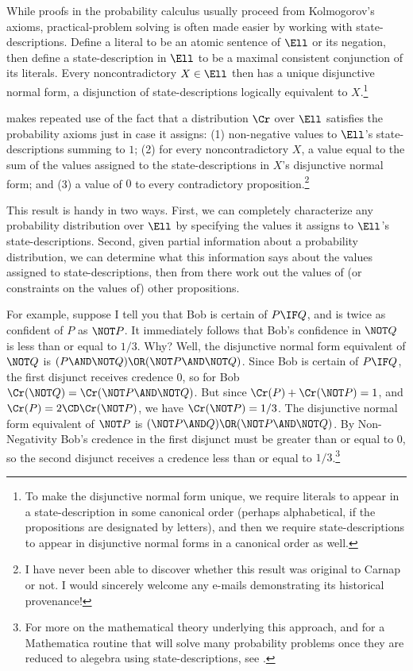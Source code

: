 While proofs in the probability calculus usually proceed from Kolmogorov's axioms, practical-problem solving is often made easier by working with state-descriptions. Define a literal to be an atomic sentence of $\Ell$ or its negation, then define a state-description in $\Ell$ to be a maximal consistent conjunction of its literals. Every noncontradictory $X \in \Ell$ then has a unique disjunctive normal form, a disjunction of state-descriptions logically equivalent to $X$.\footnote
{To make the disjunctive normal form unique, we require literals to appear in a state-description in some canonical order (perhaps alphabetical, if the propositions are designated by letters), and then we require state-descriptions to appear in disjunctive normal forms in a canonical order as well.}

\citet{CarnapLogical} makes repeated use of the fact that a distribution $\Cr$ over $\Ell$ satisfies the probability axioms just in case it assigns: (1) non-negative values to $\Ell$'s state-descriptions summing to $1$; (2) for every noncontradictory $X$, a value equal to the sum of the values assigned to the state-descriptions in $X$'s disjunctive normal form; and (3) a value of $0$ to every contradictory proposition.\footnote
{I have never been able to discover whether this result was original to Carnap or not. I would sincerely welcome any e-mails demonstrating its historical provenance!}

This result is handy in two ways. First, we can completely characterize any probability distribution over $\Ell$ by specifying the values it assigns to $\Ell$'s state-descriptions. Second, given partial information about a probability distribution, we can determine what this information says about the values assigned to state-descriptions, then from there work out the values of (or constraints on the values of) other propositions.

For example, suppose I tell you that Bob is certain of $P \IF Q$, and is twice as confident of $P$ as $\NOT P$. It immediately follows that Bob's confidence in $\NOT Q$ is less than or equal to $1/3$. Why? Well, the disjunctive normal form equivalent of $\NOT Q$ is $(P \AND \NOT Q) \OR (\NOT P \AND \NOT Q)$. Since Bob is certain of $P \IF Q$, the first disjunct receives credence $0$, so for Bob $\Cr(\NOT Q)=\Cr(\NOT P \AND \NOT Q)$. But since $\Cr(P)+\Cr(\NOT P)=1$, and $\Cr(P)=2 \CD \Cr(\NOT P)$, we have $\Cr(\NOT P)=1/3$. The disjunctive normal form equivalent of $\NOT P$ is $(\NOT P \AND Q) \OR (\NOT P \AND \NOT Q)$. By Non-Negativity Bob's credence in the first disjunct must be greater than or equal to $0$, so the second disjunct receives a credence less than or equal to $1/3$.\footnote
{For more on the mathematical theory underlying this approach, and for a Mathematica routine that will solve many probability problems once they are reduced to alegebra using state-descriptions, see \citet{FitelsonDecision}.}

